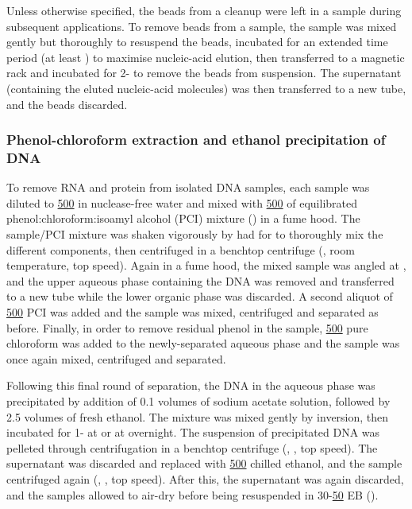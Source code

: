 Unless otherwise specified, the beads from a cleanup were left in a sample during subsequent applications. To remove beads from a sample, the sample was mixed gently but thoroughly to resuspend the beads, incubated for an extended time period (at least ) to maximise nucleic-acid elution, then transferred to a magnetic rack and incubated for 2- to remove the beads from suspension. The supernatant (containing the eluted nucleic-acid molecules) was then transferred to a new tube, and the beads discarded.

\subsubsection{Phenol-chloroform extraction and ethanol precipitation of DNA}
\label{sec:methods_molec_standard_phenol}


To remove RNA and protein from isolated DNA samples, each sample was diluted to \ul{500} in nuclease-free water and mixed with \ul{500} of equilibrated phenol:chloroform:isoamyl alcohol (PCI) mixture () in a fume hood. The sample/PCI mixture was shaken vigorously by had for  to thoroughly mix the different components, then centrifuged in a benchtop centrifuge (, room temperature, top speed). Again in a fume hood, the mixed sample was angled at , and the upper aqueous phase containing the DNA was removed and transferred to a new tube while the lower organic phase was discarded. A second aliquot of \ul{500} PCI was added and the sample was mixed, centrifuged and separated as before. Finally, in order to remove residual phenol in the sample, \ul{500} pure chloroform was added to the newly-separated aqueous phase and the sample was once again mixed, centrifuged and separated. 


Following this final round of separation, the DNA in the aqueous phase was precipitated by addition of 0.1 volumes of  sodium acetate solution, followed by 2.5 volumes of fresh  ethanol. The mixture was mixed gently by inversion, then incubated for 1- at  or at  overnight. The suspension of precipitated DNA was pelleted through centrifugation in a benchtop centrifuge (, , top speed). The supernatant was discarded and replaced with \ul{500} chilled  ethanol, and the sample centrifuged again (, , top speed). After this, the supernatant was again discarded, and the samples allowed to air-dry before being resuspended in 30-\ul{50} EB (). 

